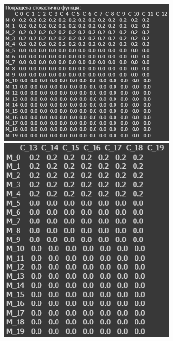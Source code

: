 \begin{figure}[!ht]
        \centering
        \begin{minipage}{0.55\linewidth}
            \includegraphics[width=0.8\textwidth, scale=0.6]{ReportPic/report_6.1.png}
        \end{minipage}
        \begin{minipage}{0.4\linewidth}
            \includegraphics[width=0.8\textwidth, scale=0.5]{ReportPic/report_6.2.png}
        \end{minipage}
\end{figure}

